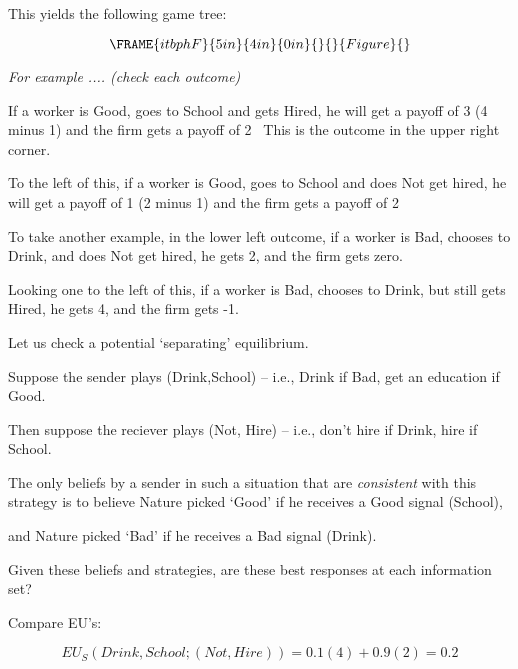 \documentclass{article}
\begin{document}
This yields the following game tree:

\begin{equation}
\FRAME{itbphF}{5in}{4in}{0in}{}{}{Figure}{\special{language "Scientific
Word";type "GRAPHIC";maintain-aspect-ratio TRUE;display "USEDEF";valid_file
"T";width 5in;height 4in;depth 0in;original-width 7.8006in;original-height
5.7164in;cropleft "0";croptop "1";cropright "1";cropbottom "0";tempfilename
'JSH9C624.wmf';tempfile-properties "XPR";}}
\end{equation}

\textit{For example .... (check each outcome)}

If a worker is Good, goes to School and gets Hired, he will get a payoff of
3 (4 minus 1) and the firm gets a payoff of 2 \ This is the outcome in the
upper right corner.

\bigskip

To the left of this, if a worker is Good, goes to School and does Not get
hired, he will get a payoff of 1 (2 minus 1) and the firm gets a payoff of 2
\ 

\bigskip

To take another example, in the lower left outcome, if a worker is Bad,
chooses to Drink, and does Not get hired, he gets 2, and the firm gets zero.
\ 

Looking one to the left of this, if a worker is Bad, chooses to Drink, but
still gets Hired, he gets 4, and the firm gets -1. \ 

\bigskip

Let us check a potential `separating' equilibrium.

Suppose the sender plays (Drink,School) -- i.e., Drink if Bad, get an
education if Good.

Then suppose the reciever plays (Not, Hire) -- i.e., don't hire if Drink,
hire if School.

\bigskip

The only beliefs by a sender in such a situation that are \textit{consistent}
with this strategy is to believe Nature picked `Good' if he receives a Good
signal (School),

and Nature picked `Bad' if he receives a Bad signal (Drink). \ 

\bigskip

Given these beliefs and strategies, are these best responses at each
information set?

\bigskip

Compare EU's:

\[
EU_{S}(Drink,School;(Not,Hire))=0.1(4)+0.9(2)=0.2 
\]
\end{document}
